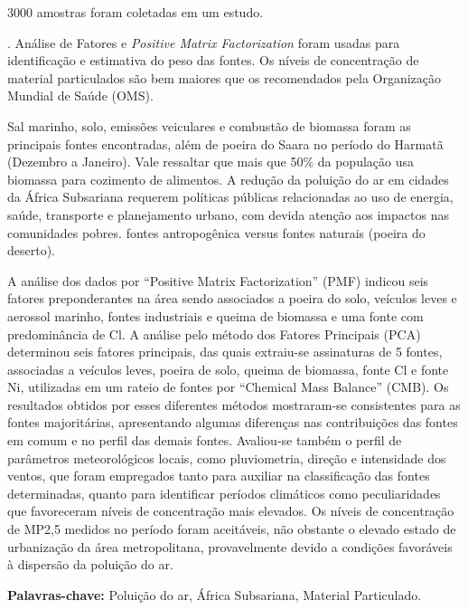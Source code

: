 3000 amostras foram coletadas em um estudo. 
\cite{zhou2011}
\cite{zhou2014chemical}


. Análise de Fatores e \textit{Positive Matrix Factorization} foram usadas para identificação e 
estimativa do peso das fontes. Os níveis de concentração de material particulados são bem maiores que os 
recomendados pela Organização Mundial de Saúde (OMS).%
 
Sal marinho, solo, emissões veiculares e combustão de biomassa foram as principais fontes encontradas, além 
de poeira do Saara no período do Harmatã (Dezembro a Janeiro). Vale ressaltar que mais que 50\% da população 
usa biomassa para cozimento de alimentos. A redução da poluição do ar em cidades da África Subsariana requerem 
políticas públicas relacionadas ao uso de energia, saúde, transporte e planejamento urbano, com devida atenção 
aos impactos nas comunidades pobres.
fontes antropogênica versus fontes naturais (poeira do deserto).



 A análise dos dados por “Positive Matrix Factorization” (PMF) indicou seis fatores preponderantes na área sendo associados a poeira do solo, veículos leves e aerossol marinho, fontes industriais e queima de biomassa e uma fonte com predominância de Cl. A análise pelo método dos Fatores Principais (PCA) determinou seis fatores principais, das quais extraiu-se assinaturas de 5 fontes, associadas a veículos leves, poeira de solo, queima de biomassa, fonte Cl e fonte Ni, utilizadas em um rateio de fontes por “Chemical Mass Balance” (CMB). Os resultados obtidos por esses diferentes métodos mostraram-se consistentes para as fontes majoritárias, apresentando algumas diferenças nas contribuições das fontes em comum e no perfil das demais fontes. Avaliou-se também o perfil de parâmetros meteorológicos locais, como pluviometria, direção e intensidade dos ventos, que foram empregados tanto para auxiliar na classificação das fontes determinadas, quanto para identificar períodos climáticos como peculiaridades que favoreceram níveis de concentração mais elevados. Os níveis de concentração de MP2,5 medidos no período foram aceitáveis, não obstante o elevado estado de urbanização da área metropolitana, provavelmente devido a condições favoráveis à dispersão da poluição do ar.



\par
\vspace{1em}
\noindent\textbf{Palavras-chave:}  Poluição do ar, África Subsariana, Material Particulado.
\newpage
